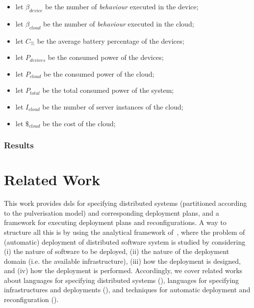 \documentclass[conference]{IEEEtran}
\begin{document}
\begin{itemize}
    \item let $\beta_{device}$ be the number of \emph{behaviour} executed in the device;
    \item let $\beta_{cloud}$ be the number of \emph{behaviour} executed in the cloud;
    \item let $C_{\%}$ be the average battery percentage of the devices;
    \item let $P_{devices}$ be the consumed power of the devices;
    \item let $P_{cloud}$ be the consumed power of the cloud;
    \item let $P_{total}$ be the total consumed power of the system;
    \item let $I_{cloud}$ be the number of server instances of the cloud;
    \item let $\$_{cloud}$ be the cost of the cloud;
\end{itemize}

\subsubsection{Results}



\section{Related Work}

This work provides 
 \acp{dsl}
 for specifying 
 distributed systems (partitioned according to the 
 pulverisation model)
 and
 corresponding deployment plans,
 and a framework for executing
 deployment plans and reconfigurations.
%
A way to structure all this 
 is by using the analytical framework of~\cite{DBLP:journals/jss/ArcangeliBL15},
  where the problem of (automatic) deployment of distributed software system is studied by considering
 (i) the nature of software to be deployed,
 (ii) the nature of the deployment domain (i.e. the available infrastructure),
 (iii) how the deployment is designed,
 and 
 (iv) how the deployment is performed.
%
Accordingly, 
 we cover related works about
 languages for 
 specifying distributed systems (),
 languages for specifying infrastructures and deployments (),
 and
 techniques for automatic deployment and reconfiguration ().
 
 
 
\end{document}
